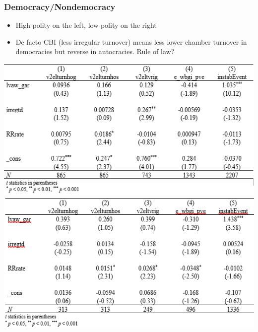 \documentclass[]{beamer}
\begin{document}
\begin{frame}
\frametitle{Democracy/Nondemocracy}
\begin{itemize}
\item High polity on the left, low polity on the right
\item De facto CBI (less irregular turnover) means less lower chamber turnover in democracies but reverse in autocracies. Rule of law?
\end{itemize}
\includegraphics{img0013.png}
\includegraphics{img0014.png}
\end{frame}
\end{document}
